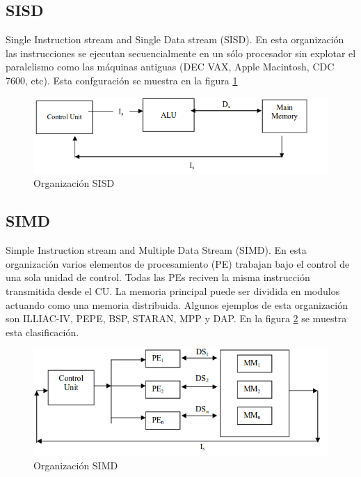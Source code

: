 \documentclass[a4paper,12pt]{article}
\begin{document}
\subsection{SISD}

Single Instruction stream and Single Data stream (SISD). En esta organización las instrucciones se ejecutan secuencialmente
en un sólo procesador sin explotar el paralelismo como las máquinas antiguas (DEC VAX, Apple Macintosh, CDC 7600, etc).
Esta confguración se muestra en la figura \ref{fig:sisd}

\begin{figure}
 \centering
 \includegraphics[scale=0.5]{3.png}
 \caption{Organización SISD}
 \label{fig:sisd}
\end{figure}

\subsection{SIMD}

Simple Instruction stream and Multiple Data Stream (SIMD). En esta organización varios elementos de procesamiento (PE)
trabajan bajo el control de una sola unidad de control. Todas las PEs reciven la misma instrucción  transmitida desde el CU.
La memoria principal puede ser dividida en modulos actuando como una memoria distribuida. Algunos ejemplos de esta
organización son  ILLIAC-IV, PEPE, BSP, STARAN, MPP y DAP. En la figura \ref{fig:simd} se muestra esta clasificación.

\begin{figure}
 \centering
 \includegraphics[scale=0.5]{4.png}
 \caption{Organización SIMD}
 \label{fig:simd}
\end{figure}
\end{document}
